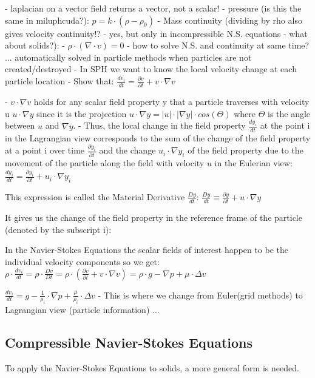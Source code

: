 - laplacian on a vector field returns a vector, not a scalar!
- pressure (is this the same in miluphcuda?):
$ p = k \cdot (\rho - \rho_0) $
- Mass continuity (dividing by rho also gives velocity continuity!? - yes, but only in incompressible N.S. equations - what about solids?):
- $\rho \cdot (\nabla \cdot v) = 0 $
- how to solve N.S. and continuity at same time? ... automatically solved in particle methods when particles are not created/destroyed
- In SPH we want to know the local velocity change at each particle location
- Show that:
$ \frac{dv_i}{dt} = \frac{\partial v}{\partial t} + v \cdot \nabla v $

- $v \cdot \nabla v $ holds for any scalar field property y that a particle traverses with velocity u $u \cdot \nabla y $ since it is the projection $u \cdot \nabla y = |u|\cdot|\nabla y| \cdot cos (\Theta)$ where $\Theta$ is the angle between $u$ and $\nabla y$.
- Thus, the local change in the field property $\frac{dy_i}{dt}$ at the point i in the Lagrangian view corresponds to the sum of the change of the field property at a point i over time $\frac{\partial y_i}{\partial t}$ and the change $u_i \cdot \nabla y_i $ of the field property due to the movement of the particle along the field with velocity $u$ in the Eulerian view:
$ \frac{dy_i}{dt} = \frac{\partial y_i}{\partial t} + u_i \cdot \nabla y_i $

This expression is called the Material Derivative $\frac{Dy}{dt}$:
$ \frac{Dy}{dt} \equiv \frac{\partial y}{\partial t} + u \cdot \nabla y $

It gives us the change of the field property in the reference frame of the particle (denoted by the subscript i):

In the Navier-Stokes Equations the scalar fields of interest happen to be the individual velocity components so we get:
$\rho \cdot \frac{dv_i}{dt} = \rho \cdot \frac{Dv}{Dt} = \rho \cdot (\frac{\partial v}{\partial t} + v \cdot \nabla v) = \rho \cdot g - \nabla p + \mu \cdot \Delta v $

$ \frac{dv_i}{dt} = g - \frac{1}{\rho_i}\cdot \nabla p + \frac{\mu}{\rho_i} \cdot \Delta  v $
- This is where we change from Euler(grid methods) to Lagrangian view (particle information) ...

\subsection{Compressible Navier-Stokes Equations}
To apply the Navier-Stokes Equations to solids, a more general form is needed.



